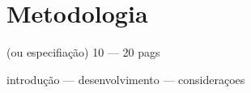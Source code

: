 
\chapter{Metodologia}
(ou especifiação) 10 --- 20 pags

introdução --- desenvolvimento --- consideraçoes
